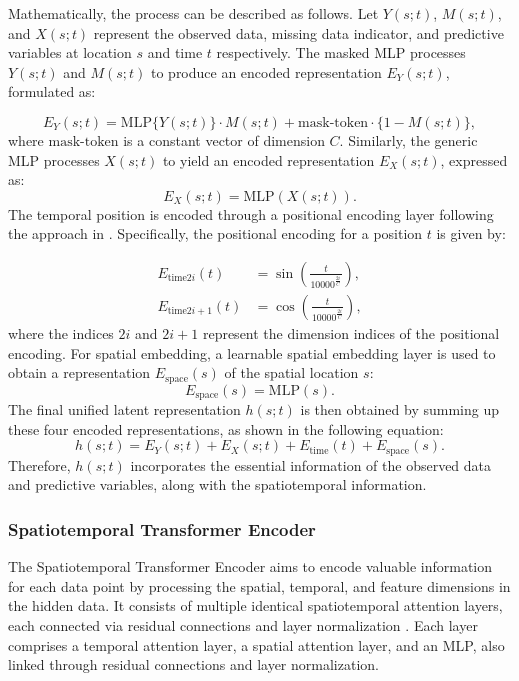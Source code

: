 \documentclass[11pt]{article}
\begin{document}
Mathematically, the process can be described as follows. Let $Y(s;t)$, $M(s;t)$, and $X(s;t)$ represent the observed data, missing data indicator, and predictive variables at location $s$ and time $t$ respectively. The masked MLP processes $Y(s;t)$ and $M(s;t)$ to produce an encoded representation $E_{Y}(s;t)$, formulated as: 

\begin{equation}
    E_{Y}(s;t) = \text{MLP}\{Y(s;t)\}\cdot M(s;t) + \text{mask-token} \cdot \{1-M(s;t)\},
\end{equation}
where $\text{mask-token}$ is a constant vector of dimension $C$. Similarly, the generic MLP processes $X(s;t)$ to yield an encoded representation $E_{X}(s;t)$, expressed as:
\begin{equation}
	E_{X}(s;t) = \text{MLP}(X(s;t)).
\end{equation}
The temporal position is encoded through a positional encoding layer following the approach in \citep{vaswani2017attention}. Specifically, the positional encoding for a position $t$ is given by:

\begin{align}
    E_{\text{time}2i}(t) &= \sin\left(\frac{t}{10000^{\frac{2i}{C}}}\right),\\
    E_{\text{time}2i+1}(t) &= \cos\left(\frac{t}{10000^{\frac{2i}{C}}}\right),
\end{align}
where the indices $2i$ and $2i+1$ represent the dimension indices of the positional encoding.
For spatial embedding, a learnable spatial embedding layer is used to obtain a representation $E_{\text{space}}(s)$ of the spatial location $s$:
\begin{equation}
	E_{\text{space}}(s) = \text{MLP}(s).
\end{equation}
The final unified latent representation $h(s;t)$ is then obtained by summing up these four encoded representations, as shown in the following equation:
\begin{equation}
	h(s;t) = E_{Y}(s;t) + E_{X}(s;t) + E_{\text{time}}(t) + E_{\text{space}}(s).
\end{equation}
 Therefore, $h(s;t)$ incorporates the essential information of the observed data and predictive variables, along with the spatiotemporal information.



\subsubsection*{Spatiotemporal Transformer Encoder}
The Spatiotemporal Transformer Encoder aims to encode valuable information for each data point by processing the spatial, temporal, and feature dimensions in the hidden data. It consists of multiple identical spatiotemporal attention layers, each connected via residual connections and layer normalization  \citep{ba2016layer}. Each layer comprises a temporal attention layer, a spatial attention layer, and an MLP, also linked through residual connections and layer normalization.
\end{document}
